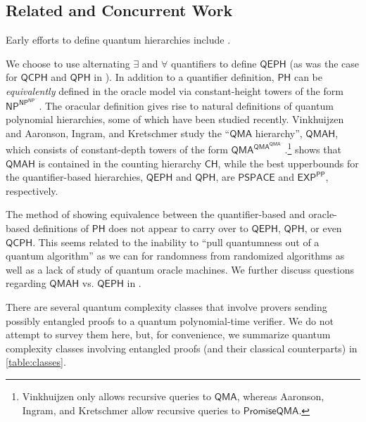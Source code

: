 \documentclass[11pt]{article}
\theoremstyle{definition}
\newcommand{\class}[1]{\ensuremath{\mathsf{#1}}\xspace}
\newcommand{\NP}{\class{NP}}
\newcommand{\EXP}{\class{EXP}}
\newcommand{\PSPACE}{\class{PSPACE}}
\newcommand{\QMA}{\class{QMA}}
\newcommand{\CH}{\class{CH}}
\newcommand{\PP}{\class{PP}}
\newcommand{\PH}{\class{PH}}
\newcommand{\QCPH}{\class{QCPH}}
\newcommand{\QPH}{\class{QPH}}
\newcommand{\QEPH}{\class{QEPH}}
\newcommand{\QMAH}{\class{QMAH}}
\begin{document}
\subsection{Related and Concurrent Work}\label{subsec:related-work}
Early efforts to define quantum hierarchies include \cite{yamakami2002quantum,gharibian2012hardness}.

We choose to use alternating $\exists$ and $\forall$ quantifiers to define $\QEPH$ (as was the case for $\QCPH$ and $\QPH$ in \cite{GSSSY22_qph}).
In addition to a quantifier definition, $\PH$ can be \emph{equivalently} defined in the oracle model via constant-height towers of the form $\NP^{\NP^{\NP^{\ldots}}}$.
The oracular definition gives rise to natural definitions of quantum polynomial hierarchies, some of which have been studied recently.
Vinkhuijzen \cite{V18_BQPHthesis} and Aaronson, Ingram, and Kretschmer \cite{AIK22_acrobatics} study the ``$\QMA$ hierarchy'', $\mathsf{QMAH}$, which consists of constant-depth towers of the form $\QMA^{\QMA^{\QMA^{\ldots}}}$.\footnote{Vinkhuijzen only allows recursive queries to $\QMA$, whereas Aaronson, Ingram, and Kretschmer allow recursive queries to ${\mathsf{PromiseQMA}}$.}  
\cite[Theorem 5]{V18_BQPHthesis} shows that $\mathsf{QMAH}$ is contained in the counting hierarchy $\CH$, while the best upperbounds for the quantifier-based hierarchies, $\QEPH$ and $\QPH$, are $\PSPACE$ and $\EXP^\PP$, respectively. 

The method of showing equivalence between the quantifier-based and oracle-based definitions of $\PH$ does not appear to carry over to $\QEPH$, $\QPH$, or even $\QCPH$.
This seems related to the inability to ``pull quantumness out of a quantum algorithm'' as we can for randomness from randomized algorithms \cite{AIK22_acrobatics} as well as a lack of study of quantum oracle machines.
We further discuss questions regarding $\QMAH$ vs. $\QEPH$  in .

There are several quantum complexity classes that involve provers sending possibly entangled proofs to a quantum polynomial-time verifier. 
We do not attempt to survey them here, but, for convenience, we summarize quantum complexity classes involving entangled proofs (and their classical counterparts) in \cref{table:classes}. 
\end{document}
